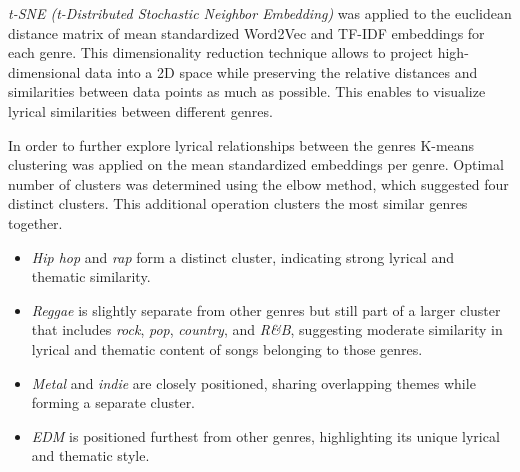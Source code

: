 \textit{t-SNE (t-Distributed Stochastic Neighbor Embedding)} was applied to the
euclidean distance matrix of mean standardized Word2Vec and TF-IDF embeddings
for each genre. This dimensionality reduction technique allows to project
high-dimensional data into a 2D space while preserving the relative distances
and similarities between data points as much as possible. This enables to
visualize lyrical similarities between different genres.

In order to further  explore lyrical relationships between the genres K-means
clustering was applied on the mean standardized embeddings per genre. Optimal
number of clusters was determined using the elbow method, which suggested four
distinct clusters. This additional operation clusters the most similar genres
together.

\begin{itemize}
  \item \textit{Hip hop} and \textit{rap} form a distinct cluster, indicating
    strong lyrical and thematic similarity.
  \item \textit{Reggae} is slightly separate from other genres but still part
    of a larger cluster that includes \textit{rock}, \textit{pop},
    \textit{country}, and \textit{R\&B}, suggesting moderate similarity in
    lyrical and thematic content of songs belonging to those genres.
  \item \textit{Metal} and \textit{indie} are closely positioned, sharing
    overlapping themes while forming a separate cluster.
  \item \textit{EDM} is positioned furthest from other genres, highlighting
    its unique lyrical and thematic style.
\end{itemize}

